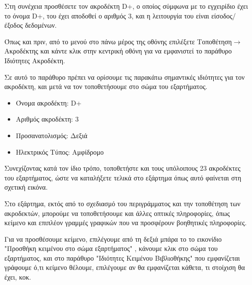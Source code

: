 \documentclass[a4paper]{article}
\begin{document}
Στη συνέχεια προσθέσετε τον ακροδέκτη D+, ο οποίος σύμφωνα με το εγχειρίδιο έχει το όνομα D+, του έχει αποδοθεί ο αριθμός 3, και η λειτουργία του είναι είσοδος/έξοδος δεδομένων.

Όπως και πριν, από το μενού στο πάνω μέρος της οθόνης επιλέξετε Τοποθέτηση$\rightarrow$Ακροδέκτης και κάντε κλικ στην κεντρική οθόνη για να εμφανιστεί το παράθυρο Ιδιότητες Ακροδέκτη.

Σε αυτό το παράθυρο πρέπει να ορίσουμε τις παρακάτω σημαντικές ιδιότητες για τον ακροδέκτη, και μετά να τον τοποθετήσουμε στο σώμα του εξαρτήματος.

\begin{itemize}
    \item Όνομα ακροδέκτη: D+
    \item Αριθμός ακροδέκτη: 3
    \item Προσανατολισμός: Δεξιά
    \item Ηλεκτρικός Τύπος: Αμφίδρομο
\end{itemize}

\begin{figure}
  \begin{center}
    \label{fig:kicad-main}
  \end{center}
\end{figure}

Συνεχίζοντας κατά τον ίδιο τρόπο, τοποθετήστε και τους υπόλοιπους 23 ακροδέκτες του εξαρτήματος, ώστε να καταλήξετε τελικά στο εξάρτημα όπως αυτό φαίνεται στη σχετική εικόνα.

\begin{figure}
  \begin{center}
    \label{fig:kicad-main}
  \end{center}
\end{figure}

Στο εξάρτημα, εκτός από το σχεδιασμό του περιγράμματος και την τοποθέτηση των ακροδεκτών, μπορούμε να τοποθετήσουμε και άλλες οπτικές πληροφορίες, όπως κείμενο και επιπλέον γραμμές γραφικών που να προσφέρουν βοηθητικές πληροφορίες.

Για να προσθέσουμε κείμενο, επιλέγουμε από τη δεξιά μπάρα το το εικονίδιο "Προσθήκη κειμένου στο σώμα εξαρτήματος" %
, κάνουμε κλικ στο σώμα του εξαρτήματος, και στο παράθυρο "Ιδιότητες Κειμένου Βιβλιοθήκης" που εμφανίζεται γράφουμε ό,τι κείμενο θέλουμε, επιλέγουμε αν θα εμφανίζεται κάθετα, τι στοίχιση θα έχει, κοκ.
\end{document}
